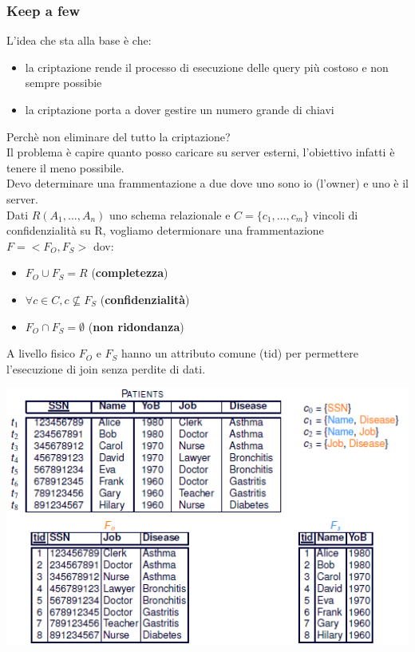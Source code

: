 \subsubsection{Keep a few}
L'idea che sta alla base è che:
\begin{itemize}
    \item  la criptazione rende il processo di esecuzione delle query più costoso e non sempre possibie
    \item la criptazione porta a dover gestire un numero grande di chiavi
\end{itemize}
Perchè non eliminare del tutto la criptazione?\\
Il problema è capire quanto posso caricare su server esterni, l'obiettivo infatti è tenere il meno possibile.\\
Devo determinare una frammentazione a due dove uno sono io (l'owner) e uno è il server.\\
Dati \(R(A_1,...,A_n)\) uno schema relazionale e \(C=\{c_1,...,c_m\}\) vincoli di confidenzialità su R, vogliamo determionare una frammentazione \(F=<F_O,F_S>\) dov:
\begin{itemize}
    \item \(F_O \cup F_S = R\) (\textbf{completezza})
    \item \(\forall c \in C, c\nsubseteq F_S\) (\textbf{confidenzialità})
    \item \(F_O \cap F_S = \emptyset \) (\textbf{non ridondanza})
\end{itemize}
A livello fisico \(F_O\) e \(F_S\) hanno un attributo comune (tid) per permettere l'esecuzione di join senza perdite di dati.
\begin{center}
    \includegraphics[scale=0.7]{img/keepafew.png}
\end{center}
